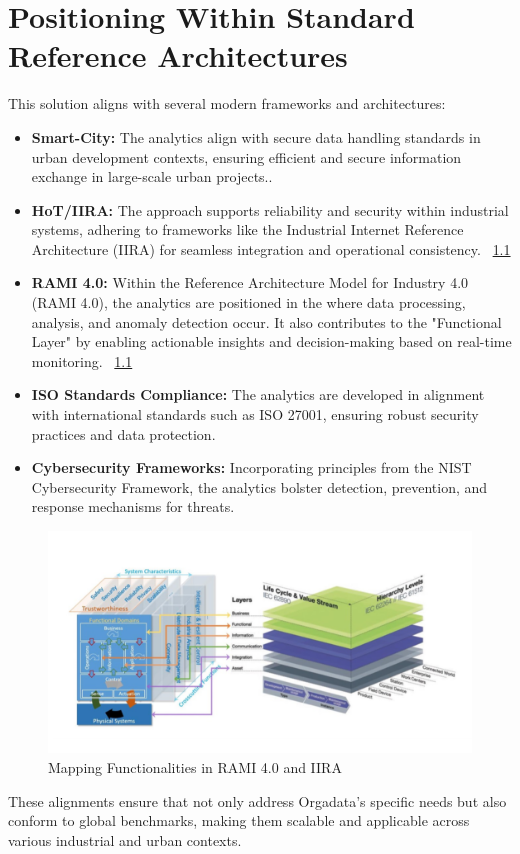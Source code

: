 %
%

\chapter{Positioning Within Standard Reference Architectures}

This solution aligns with several modern frameworks and architectures:

\begin{itemize}
	\item \textbf{Smart-City:} The analytics align with secure data handling standards in urban development contexts, ensuring efficient and secure information exchange in large-scale urban projects..
	\item \textbf{HoT/IIRA:} The approach supports reliability and security within industrial systems, adhering to frameworks like the Industrial Internet Reference Architecture (IIRA) for seamless integration and operational consistency. ~\ref{RAMI_IIRA}
	\item \textbf{RAMI 4.0:} Within the Reference Architecture Model for Industry 4.0 (RAMI 4.0), the analytics are positioned in the  where data processing, analysis, and anomaly detection occur. It also contributes to the "Functional Layer" by enabling actionable insights and decision-making based on real-time monitoring.  ~\ref{RAMI_IIRA}
	\item \textbf{ISO Standards Compliance:} The analytics are developed in alignment with international standards such as ISO 27001, ensuring robust security practices and data protection.
	\item \textbf{Cybersecurity Frameworks:} Incorporating principles from the NIST Cybersecurity Framework, the analytics bolster detection, prevention, and response mechanisms for threats.
\end{itemize}

\begin{figure}
	\begin{center}
		\includegraphics[width=0.7\linewidth]{Images/RAMI_IIRA.png}
		\caption{Mapping Functionalities in RAMI 4.0 and IIRA}
		\label{RAMI_IIRA}
	\end{center}
\end{figure}
  
  These alignments ensure that  not only address Orgadata’s specific needs but also conform to global benchmarks, making them scalable and applicable across various industrial and urban contexts.
  
   
  
   

 
